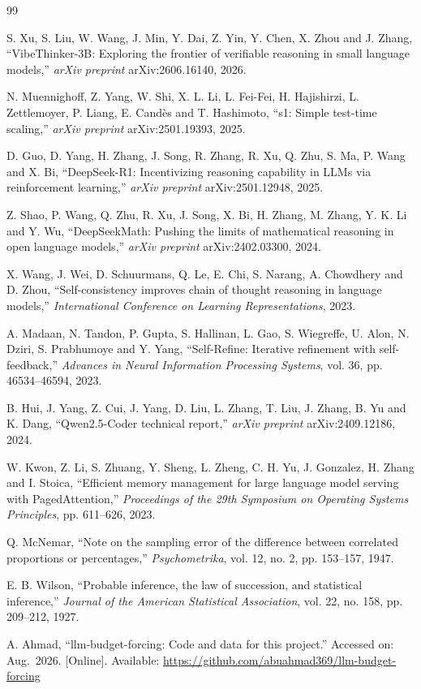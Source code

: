 \documentclass[12pt,a4paper,oneside]{report}
\begin{document}
\begin{thebibliography}{99}

S. Xu, S. Liu, W. Wang, J. Min, Y. Dai, Z. Yin, Y. Chen, X. Zhou and J. Zhang,
``VibeThinker-3B: Exploring the frontier of verifiable reasoning in small
language models,'' \emph{arXiv preprint} arXiv:2606.16140, 2026.

N. Muennighoff, Z. Yang, W. Shi, X. L. Li, L. Fei-Fei, H. Hajishirzi,
L. Zettlemoyer, P. Liang, E. Cand\`{e}s and T. Hashimoto, ``s1: Simple test-time
scaling,'' \emph{arXiv preprint} arXiv:2501.19393, 2025.

D. Guo, D. Yang, H. Zhang, J. Song, R. Zhang, R. Xu, Q. Zhu, S. Ma, P. Wang and
X. Bi, ``DeepSeek-R1: Incentivizing reasoning capability in LLMs via
reinforcement learning,'' \emph{arXiv preprint} arXiv:2501.12948, 2025.

Z. Shao, P. Wang, Q. Zhu, R. Xu, J. Song, X. Bi, H. Zhang, M. Zhang, Y. K. Li
and Y. Wu, ``DeepSeekMath: Pushing the limits of mathematical reasoning in open
language models,'' \emph{arXiv preprint} arXiv:2402.03300, 2024.

X. Wang, J. Wei, D. Schuurmans, Q. Le, E. Chi, S. Narang, A. Chowdhery and
D. Zhou, ``Self-consistency improves chain of thought reasoning in language
models,'' \emph{International Conference on Learning Representations}, 2023.

A. Madaan, N. Tandon, P. Gupta, S. Hallinan, L. Gao, S. Wiegreffe, U. Alon,
N. Dziri, S. Prabhumoye and Y. Yang, ``Self-Refine: Iterative refinement with
self-feedback,'' \emph{Advances in Neural Information Processing Systems},
vol. 36, pp. 46534--46594, 2023.

B. Hui, J. Yang, Z. Cui, J. Yang, D. Liu, L. Zhang, T. Liu, J. Zhang, B. Yu and
K. Dang, ``Qwen2.5-Coder technical report,'' \emph{arXiv preprint}
arXiv:2409.12186, 2024.

W. Kwon, Z. Li, S. Zhuang, Y. Sheng, L. Zheng, C. H. Yu, J. Gonzalez, H. Zhang
and I. Stoica, ``Efficient memory management for large language model serving
with PagedAttention,'' \emph{Proceedings of the 29th Symposium on Operating
Systems Principles}, pp. 611--626, 2023.

Q. McNemar, ``Note on the sampling error of the difference between correlated
proportions or percentages,'' \emph{Psychometrika}, vol. 12, no. 2,
pp. 153--157, 1947.

E. B. Wilson, ``Probable inference, the law of succession, and statistical
inference,'' \emph{Journal of the American Statistical Association}, vol. 22,
no. 158, pp. 209--212, 1927.

A. Ahmad, ``llm-budget-forcing: Code and data for this project.'' Accessed on:
Aug.\ 2026. [Online]. Available:
\url{https://github.com/abuahmad369/llm-budget-forcing}

\end{thebibliography}
\end{document}
